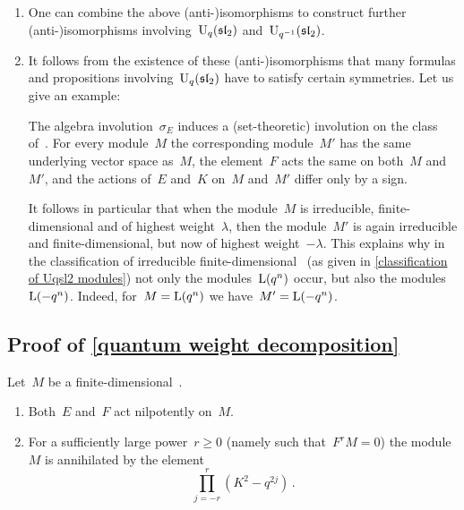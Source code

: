 \documentclass[a4paper, 11pt, oneside]{scrartcl}
\begin{document}
\begin{remark}
  \leavevmode
  \begin{enumerate}
    \item
      One can combine the above (anti-)isomorphisms to construct further (anti-)isomorphisms involving~$\operatorname{U}_q(\mathfrak{sl}_2)$ and~$\operatorname{U}_{q^{-1}}(\mathfrak{sl}_2)$.
    \item
      It follows from the existence of these (anti-)isomorphisms that many formulas and propositions involving~$\operatorname{U}_q(\mathfrak{sl}_2)$ have to satisfy certain symmetries.
      Let us give an example:

      The algebra involution~$\sigma_E$ induces a (set-theoretic) involution on the class of~.
      For every module~$M$ the corresponding module~$M'$ has the same underlying vector space as~$M$, the element~$F$ acts the same on both~$M$ and~$M'$, and the actions of~$E$ and~$K$ on~$M$ and~$M'$ differ only by a sign.

      It follows in particular that when the module~$M$ is irreducible, finite-dimensional and of highest weight~$\lambda$, then the module~$M'$ is again irreducible and finite-dimensional, but now of highest weight~$-\lambda$.
      This explains why in the classification of irreducible finite-dimensional~ (as given in \cref{classification of Uqsl2 modules}) not only the modules~$\operatorname{L}(q^n)$ occur, but also the modules~$\operatorname{L}(-q^n)$.
      Indeed, for~$M = \operatorname{L}(q^n)$ we have~$M' = \operatorname{L}(-q^n)$.
  \end{enumerate}
\end{remark}



\subsection{Proof of \cref{quantum weight decomposition}}
\label{proof of quantum weight decomposition}

\begin{lemma}
  \label{action on finite dimensional modules}
  Let~$M$ be a finite-dimensional~.
  \begin{enumerate}
    \item
      Both~$E$ and~$F$ act nilpotently on~$M$.
    \item
      For a sufficiently large power~$r \geq 0$ (namely such that~$F^r M = 0$) the module~$M$ is annihilated by the element
      \[
        \prod_{j = -r}^r (K^2 - q^{2j}) \,.
      \]
  \end{enumerate}
\end{lemma}
\end{document}
